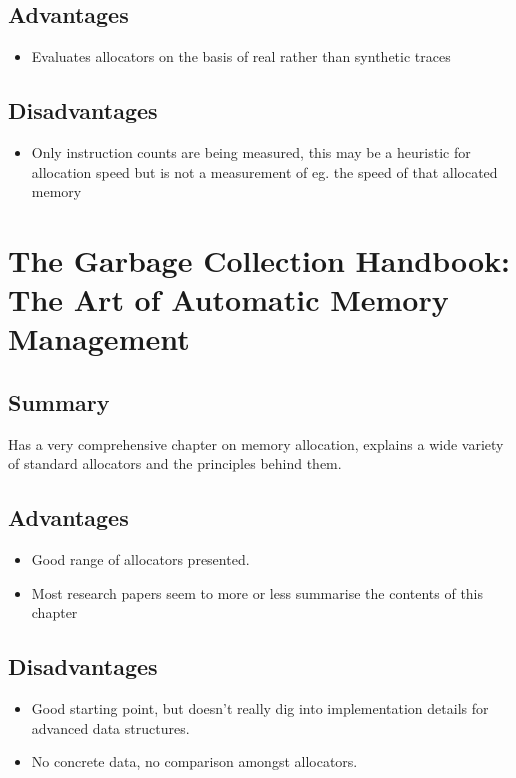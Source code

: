 \documentclass{report}
\begin{document}
\subsection{Advantages}
\begin{itemize}
	\item{Evaluates allocators on the basis of real rather than synthetic traces}
\end{itemize}

\subsection{Disadvantages}
\begin{itemize}
	\item{Only instruction counts are being measured, this may be a heuristic for allocation speed but is not a measurement of eg. the speed of that allocated memory}
\end{itemize}

\section[GC Handbook]{The Garbage Collection Handbook: The Art of Automatic Memory Management \cite{10.5555/2025255}}
\subsection{Summary}
Has a very comprehensive chapter on memory allocation, explains a wide variety of standard allocators and the principles behind them.
\subsection{Advantages}
\begin{itemize}
	\item{Good range of allocators presented.}
	\item{Most research papers seem to more or less summarise the contents of this chapter}
\end{itemize}

\subsection{Disadvantages}
\begin{itemize}
	\item{Good starting point, but doesn't really dig into implementation details for advanced data structures.}
	\item{No concrete data, no comparison amongst allocators.}
\end{itemize}
\end{document}
